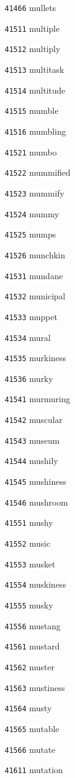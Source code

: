 \documentclass[twoside,11pt]{article}
\begin{document}
\begin{multicols}{5}
\begin{enumerate}
\item[\texttt{41466}] mullets
\item[\texttt{41511}] multiple
\item[\texttt{41512}] multiply
\item[\texttt{41513}] multitask
\item[\texttt{41514}] multitude
\item[\texttt{41515}] mumble
\item[\texttt{41516}] mumbling
\item[\texttt{41521}] mumbo
\item[\texttt{41522}] mummified
\item[\texttt{41523}] mummify
\item[\texttt{41524}] mummy
\item[\texttt{41525}] mumps
\item[\texttt{41526}] munchkin
\item[\texttt{41531}] mundane
\item[\texttt{41532}] municipal
\item[\texttt{41533}] muppet
\item[\texttt{41534}] mural
\item[\texttt{41535}] murkiness
\item[\texttt{41536}] murky
\item[\texttt{41541}] murmuring
\item[\texttt{41542}] muscular
\item[\texttt{41543}] museum
\item[\texttt{41544}] mushily
\item[\texttt{41545}] mushiness
\item[\texttt{41546}] mushroom
\item[\texttt{41551}] mushy
\item[\texttt{41552}] music
\item[\texttt{41553}] musket
\item[\texttt{41554}] muskiness
\item[\texttt{41555}] musky
\item[\texttt{41556}] mustang
\item[\texttt{41561}] mustard
\item[\texttt{41562}] muster
\item[\texttt{41563}] mustiness
\item[\texttt{41564}] musty
\item[\texttt{41565}] mutable
\item[\texttt{41566}] mutate
\item[\texttt{41611}] mutation

\end{enumerate}
\end{multicols}
\end{document}
